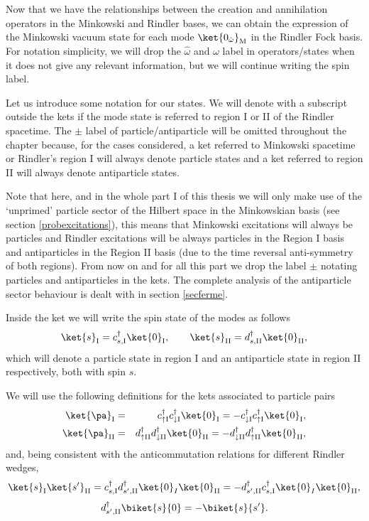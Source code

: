 Now that we have the relationships between the creation and annihilation operators in the Minkowski and Rindler bases, we can obtain the expression of the Minkowski vacuum state for each mode $\ket{0_{\hat\omega}}_\text{M}$ in the Rindler Fock basis. For notation simplicity, we will drop the $\hat \omega$ and $\omega$ label in operators/states when it does not give any relevant information, but we will continue writing the spin label.

Let us introduce some notation for our states. We will denote with a subscript outside the kets if the mode state is referred to region I or II of the Rindler spacetime. The $\pm$ label of particle/antiparticle will be omitted throughout the chapter because, for the cases considered, a ket referred to Minkowski spacetime or Rindler's region I will always denote particle states and a ket referred to region II will always denote antiparticle states.

Note that here, and in the whole part I of this thesis we will only make use of the `unprimed' particle sector of the Hilbert space in the Minkowskian basis (see section \ref{probexcitations}), this means that Minkowski excitations will always be particles and Rindler excitations will be always particles in the Region I basis and antiparticles in the Region II basis (due to the time reversal anti-symmetry of both regions). From now on and for all this part we drop the label $\pm$ notating particles and antiparticles in the kets. The complete analysis of the antiparticle sector behaviour is dealt with in section \ref{secferme}.

Inside the ket we will write the spin state of the modes as follows
\begin{equation}\label{notation1}
\ket{s}_\text{I}=c^\dagger_{s,\text{I}}\ket{0}_\text{I},\qquad \ket{s}_{\text{II}}=d^\dagger_{s,\text{II}}\ket{0}_{\text{II}},
\end{equation}
which will denote a particle state in region I and an antiparticle state in region II respectively, both with spin $s$.

We will use the following definitions for the kets associated to particle pairs
\begin{eqnarray}\label{notation2}
\nonumber \ket{\pa}_\text{I}&=&c^\dagger_{\uparrow\text{I}}c^\dagger_{\downarrow\text{I}}\ket{0}_\text{I}=-c^\dagger_{\downarrow\text{I}}c^\dagger_{\uparrow\text{I}}\ket{0}_\text{I},\\*
\ket{\pa}_\text{II}&=&d^\dagger_{\uparrow\text{II}}d^\dagger_{\downarrow\text{II}}\ket{0}_\text{II}=-d^\dagger_{\downarrow\text{II}}d^\dagger_{\uparrow\text{II}}\ket{0}_\text{II},
\end{eqnarray}
and, being consistent with the anticommutation relations for different Rindler wedges,
\begin{equation}\label{notation3}
\nonumber \ket{s}_\text{I}\ket{s'}_\text{II}=c^\dagger_{s,\text{I}}d^\dagger_{s',\text{II}}\ket{0}_{I}\ket{0}_\text{II}=-d^\dagger_{s',\text{II}}c^\dagger_{s,\text{I}}\ket{0}_{I}\ket{0}_\text{II},
\end{equation}
\begin{equation}\label{notation4}
d^\dagger_{s',\text{II}}\biket{s}{0}=-\biket{s}{s'}.
\end{equation}

